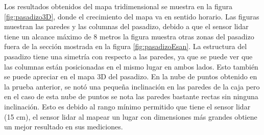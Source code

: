Los resultados obtenidos del mapa tridimensional se muestra en la figura \ref{fig:pasadizo3D}, 
donde el crecimiento del mapa va en sentido horario. Las figuras muestran las paredes y las 
columnas del pasadizo, debido a que el sensor lidar tiene un alcance máximo de 8 metros la 
figura muestra otras zonas del pasadizo fuera de la sección mostrada en la figura 
\ref{fig:pasadizoEsan}. La estructura del pasadizo tiene una simetría con respecto a las 
paredes, ya que se puede ver que las columnas están posicionadas en el mismo lugar en 
ambos lados. Esto también se puede apreciar en el mapa 3D del pasadizo. En la nube de puntos 
obtenido en la prueba anterior, se notó una pequeña inclinación en las paredes de la caja 
pero en el caso de esta nube de puntos se nota las paredes bastante rectas sin ninguna 
inclinación. Esto es debido al rango mínimo permitido que tiene el sensor lidar (15 cm), 
el sensor lidar al mapear un lugar con dimensiones más grandes obtiene un mejor resultado en 
sus mediciones.

